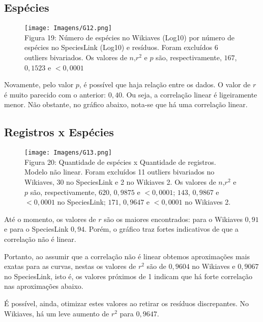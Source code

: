 \documentclass[12pt]{extarticle}
\newenvironment{resposta}{ \color{mygray}}{}
\begin{document}
\subsection{Espécies}

\begin{figure}[h!]
\centering
\texttt{[image: Imagens/G12.png]}
\\{\scriptsize Figura 19: Número de espécies no Wikiaves (Log10) por número de espécies no SpeciesLink (Log10) e resíduos. Foram excluídos 6 outliers bivariados. Os valores de $n$,$r^2$ e $p$ são, respectivamente, $167$, $0,1523$ e $<0,0001$}
\end{figure}

\begin{resposta}
Novamente, pelo valor $p$, é possível que haja relação entre os dados. O valor de $r$ é muito parecido com o anterior: $0,40$. Ou seja, a correlação linear é ligeiramente menor. Não obstante, no gráfico abaixo, nota-se que há uma correlação linear. 

\end{resposta}

\subsection {Registros x Espécies}

\begin{figure}[h!]
\centering
\texttt{[image: Imagens/G13.png]}
\\{\scriptsize Figura 20: Quantidade de espécies x Quantidade de registros. Modelo não linear. Foram excluídos 11 outliers bivariados no Wikiaves, 30 no SpeciesLink e 2 no Wikiaves 2.  Os valores de $n$,$r^2$ e $p$ são, respectivamente, $620$, $0,9875$ e $<0,0001$; $143$, $0,9867$ e $<0,0001$ no SpeciesLink; $171$, $0,9647$ e $<0,0001$ no Wikiaves 2. }
\label{Figura 20}
\end{figure}

\begin{resposta}
Até o momento, os valores de $r$ são os maiores encontrados: para o Wikiaves $0,91$ e para o SpeciesLink $0,94$. Porém, o gráfico traz fortes indicativos de que a correlação não é linear.

Portanto, ao assumir que a correlação não é linear obtemos aproximações mais exatas para as curvas, nestas os valores de $r^2$ são de $0,9604$ no Wikiaves e $0,9067$ no SpeciesLink, isto é, os valores próximos de 1 indicam que há forte correlação nas aproximações abaixo.

É possível, ainda, otimizar estes valores ao retirar os resíduos discrepantes. No Wikiaves, há um leve aumento de $r^2$ para $0,9647$.


\end{resposta}
\end{document}
